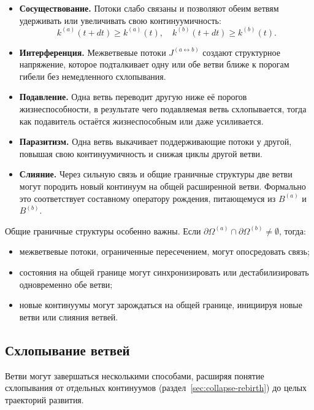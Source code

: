 \begin{itemize}
  \item \textbf{Сосуществование.}\quad
        Потоки слабо связаны и позволяют обеим ветвям удерживать или увеличивать
        свою континуумичность:
        \[
          k^{(a)}(t+dt) \ge k^{(a)}(t),\quad
          k^{(b)}(t+dt) \ge k^{(b)}(t).
        \]
  \item \textbf{Интерференция.}\quad
        Межветвевые потоки \(J^{(a\leftrightarrow b)}\) создают
        структурное напряжение, которое подталкивает одну или обе ветви
        ближе к порогам гибели без немедленного схлопывания.
  \item \textbf{Подавление.}\quad
        Одна ветвь переводит другую ниже её порогов жизнеспособности,
        в результате чего подавляемая ветвь схлопывается, тогда как
        подавитель остаётся жизнеспособным или даже усиливается.
  \item \textbf{Паразитизм.}\quad
        Одна ветвь выкачивает поддерживающие потоки у другой, повышая свою
        континуумичность и снижая циклы другой ветви.
  \item \textbf{Слияние.}\quad
        Через сильную связь и общие граничные структуры две ветви могут
        породить новый континуум на общей расширенной ветви. Формально это
        соответствует составному оператору рождения, питающемуся из
        \(B^{(a)}\) и \(B^{(b)}\).
\end{itemize}

Общие граничные структуры особенно важны. Если
\(\partial\Omega^{(a)}\cap\partial\Omega^{(b)}\neq\emptyset\), тогда:
\begin{itemize}
  \item межветвевые потоки, ограниченные пересечением, могут опосредовать
        связь;
  \item состояния на общей границе могут синхронизировать или
        дестабилизировать одновременно обе ветви;
  \item новые континуумы могут зарождаться на общей границе, инициируя новые
        ветви или слияния ветвей.
\end{itemize}

\subsection{Схлопывание ветвей}

Ветви могут завершаться несколькими способами, расширяя понятие
схлопывания от отдельных континуумов
(раздел~\ref{sec:collapse-rebirth}) до целых траекторий развития.

